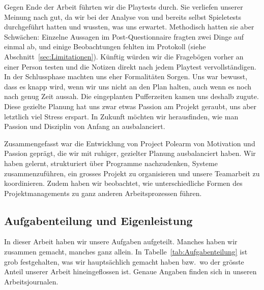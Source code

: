 \documentclass[../Main.tex]{subfiles}
\begin{document}
Gegen Ende der Arbeit führten wir die Playtests durch. Sie verliefen unserer Meinung nach gut, da wir bei der Analyse von  und  bereits selbst Spieletests durchgeführt hatten und wussten, was uns erwartet. Methodisch hatten sie aber Schwächen: Einzelne Aussagen im Post-Questionnaire fragten zwei Dinge auf einmal ab, und einige Beobachtungen fehlten im Protokoll (siehe Abschnitt~\ref{sec:Limitationen}). Künftig würden wir die Fragebögen vorher an einer Person testen und die Notizen direkt nach jedem Playtest vervollständigen. In der Schlussphase machten uns eher Formalitäten Sorgen. Uns war bewusst, dass es knapp wird, wenn wir uns nicht an den Plan halten, auch wenn es noch nach genug Zeit aussah. Die eingeplanten Pufferzeiten kamen uns deshalb zugute. Diese gezielte Planung hat uns zwar etwas Passion am Projekt geraubt, uns aber letztlich viel Stress erspart. In Zukunft möchten wir herausfinden, wie man Passion und Disziplin von Anfang an ausbalanciert.

Zusammengefasst war die Entwicklung von Project Polearm von Motivation und Passion geprägt, die wir mit ruhiger, gezielter Planung ausbalanciert haben. Wir haben gelernt, strukturiert über Programme nachzudenken, Systeme zusammenzuführen, ein grosses Projekt zu organisieren und unsere Teamarbeit zu koordinieren. Zudem haben wir beobachtet, wie unterschiedliche Formen des Projektmanagements zu ganz anderen Arbeitsprozessen führen.

\subsection{Aufgabenteilung und Eigenleistung} \label{sec:Aufgabenteilung}

In dieser Arbeit haben wir unsere Aufgaben aufgeteilt. Manches haben wir zusammen gemacht, manches ganz allein. In Tabelle~\ref{tab:Aufgabenteilung} ist grob festgehalten, was wir hauptsächlich gemacht haben bzw.\ wo der grösste Anteil unserer Arbeit hineingeflossen ist. Genaue Angaben finden sich in unseren Arbeitsjournalen.
\end{document}
